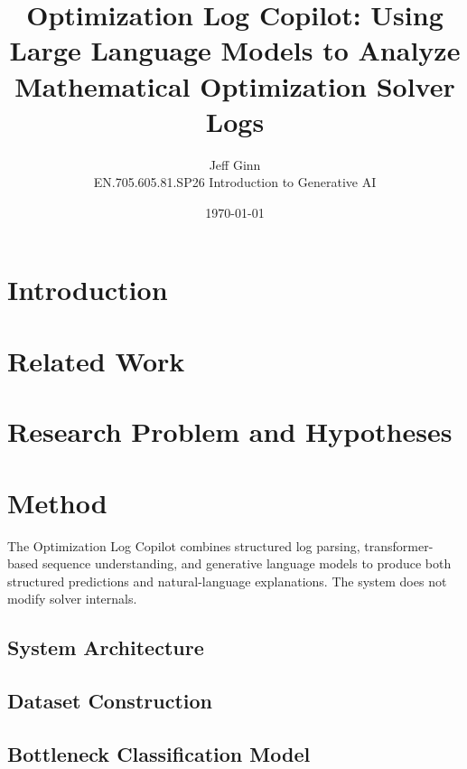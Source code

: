 \documentclass[11pt]{article}
\title{Optimization Log Copilot: Using Large Language Models to Analyze Mathematical Optimization Solver Logs}
\author{Jeff Ginn \\ EN.705.605.81.SP26 Introduction to Generative AI}
\date{\today}
\begin{document}
\maketitle

\begin{abstract}

\end{abstract}

\section{Introduction}
\label{sec:intro}



\section{Related Work}
\label{sec:related_work}


\section{Research Problem and Hypotheses}
\label{sec:problem}


\section{Method}
\label{sec:method}

The Optimization Log Copilot combines structured log parsing, transformer-based sequence understanding, and generative language models to produce both structured predictions and 
natural-language explanations. The system does not modify solver internals.

\subsection{System Architecture}


\subsection{Dataset Construction}
\label{sec:dataset}


\subsection{Bottleneck Classification Model}
\end{document}
